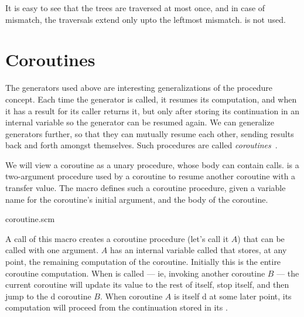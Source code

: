 
\n
It is easy to see that the trees are traversed at most
once, and in case of mismatch, the traversals extend
only upto the leftmost mismatch.   is not used.


\section{Coroutines}

The generators used above are interesting
generalizations of the procedure concept.  Each time
the generator is called, it resumes its computation,
and when it has a result for its caller returns it, but
only after storing its continuation in an internal
variable so the generator can be resumed again.  We can
generalize generators further, so that they can
mutually resume each other, sending results back and
forth amongst themselves.  Such procedures are called
{\em coroutines}~\cite{coroutine}.

We will view a coroutine as a unary procedure, whose
body can contain  calls.   is a
two-argument procedure used by a coroutine to resume
another coroutine with a transfer value.  The macro 
defines such a coroutine procedure, given a variable name for 
the coroutine's initial argument, and the body of the coroutine.

\scmfilename coroutine.scm


\n A call of this macro creates a coroutine procedure
(let's call it $A$) that can be called with one
argument.  $A$ has an internal variable called
 that stores, at any point, the
remaining computation of the coroutine.   Initially
this is the entire coroutine computation.  When
 is called --- ie, invoking another coroutine
$B$ --- the current coroutine will update its
 value to the rest of itself,
stop itself, and then jump to the d coroutine
$B$.  When coroutine $A$ is itself d at
some later point, its computation will proceed from the
continuation stored in its .


